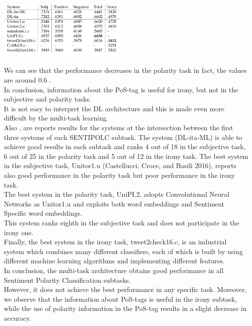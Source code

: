 \documentclass[twocolumn,10pt]{wmrDoc}
\begin{document}
\vskip 1.5cm
\includegraphics[width=0.48\textwidth]{figure/sentipolc.png}
\vskip 1cm

We can see that the performance decreases in the polarity task in fact, the values are around $0.6$ .\\
In conclusion, information about the PoS-tag is useful for irony, but not in the subjective and polarity tasks.\\
It is not easy to interpret the DL architecture and this is made even more difficult by the multi-task learning.\\
Also , are reports results for the systems at the intersection between the first three systems of each SENTIPOLC subtask. The system (DL-ita-ML) is able to achieve good results in each subtask and ranks 4 out of 18 in the subjective task, 6 out of 25 in the polarity task and 5 out of 12 in the irony task.
The best system in the subjective task, Unitor1.u \cite{DBLP:conf/acl/CroceFCB17}(Castellucci, Croce, and Basili 2016), reports also good performance in the polarity task but poor performance in the irony task.\\
The best system in the polarity task, UniPI.2, adopts Convolutional Neural Networks as Unitor1.u and exploits both word embeddings and Sentiment
Specific word embeddings.\\
This system ranks eighth in the subjective task and does not participate in the irony one.\\
Finally, the best system in the irony task, tweet2check16.c, is an industrial system which combines many different classifiers, each of which is built by using different machine learning algorithms and implementing different features.\\
In conclusion, the multi-task architecture obtains good performance in all Sentiment Polarity Classification subtasks.\\
However, it does not achieve the best performance in any specific task. Moreover, we observe that the information about PoS-tags is useful in the irony subtask, while the use of polarity information in the PoS-tag results in a slight decrease in accuracy.
\end{document}
